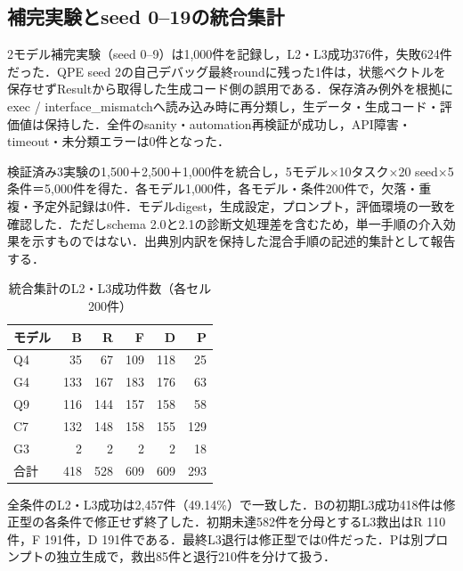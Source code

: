 \subsection{補完実験とseed 0--19の統合集計}

2モデル補完実験（seed 0--9）は1,000件を記録し，L2・L3成功376件，失敗624件だった．QPE seed 2の自己デバッグ最終roundに残った1件は，状態ベクトルを保存せずResultから取得した生成コード側の誤用である．保存済み例外を根拠にexec / interface\_mismatchへ読み込み時に再分類し，生データ・生成コード・評価値は保持した．全件のsanity・automation再検証が成功し，API障害・timeout・未分類エラーは0件となった．

検証済み3実験の1,500＋2,500＋1,000件を統合し，5モデル×10タスク×20 seed×5条件＝5,000件を得た．各モデル1,000件，各モデル・条件200件で，欠落・重複・予定外記録は0件．モデルdigest，生成設定，プロンプト，評価環境の一致を確認した．ただしschema 2.0と2.1の診断文処理差を含むため，単一手順の介入効果を示すものではない．出典別内訳を保持した混合手順の記述的集計として報告する．

\begin{table}[t]\centering

\caption{統合集計のL2・L3成功件数（各セル200件）}\label{tab:pooled}

\begin{tabular}{l|rrrrr}\hline

モデル & B & R & F & D & P \\\hline

Q4 & 35 & 67 & 109 & 118 & 25 \\

G4 & 133 & 167 & 183 & 176 & 63 \\

Q9 & 116 & 144 & 157 & 158 & 58 \\

C7 & 132 & 148 & 158 & 155 & 129 \\

G3 & 2 & 2 & 2 & 2 & 18 \\

\hline

合計 & 418 & 528 & 609 & 609 & 293 \\\hline

\end{tabular}\end{table}

全条件のL2・L3成功は2,457件（49.14\%）で一致した．Bの初期L3成功418件は修正型の各条件で修正せず終了した．初期未達582件を分母とするL3救出はR 110件，F 191件，D 191件である．最終L3退行は修正型では0件だった．Pは別プロンプトの独立生成で，救出85件と退行210件を分けて扱う．

